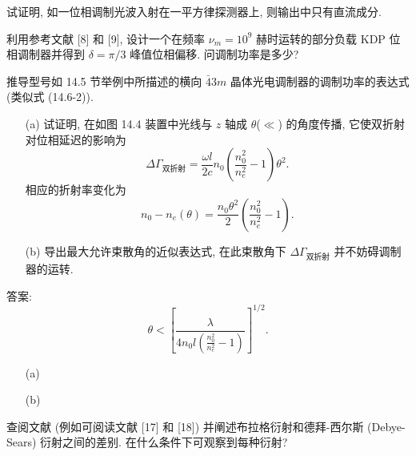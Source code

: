 \documentclass{note}
\begin{document}
\begin{exe}
    试证明, 如一位相调制光波入射在一平方律探测器上, 则输出中只有直流成分.
\end{exe}
\begin{pf}
    
\end{pf}

\begin{exe}
    利用参考文献 [8] 和 [9], 设计一个在频率 $\nu_m=10^9$ 赫时运转的部分负载 KDP 位相调制器并得到 $\delta=\pi/3$ 峰值位相偏移. 问调制功率是多少?
\end{exe}
\begin{sol}
    
\end{sol}

\begin{exe}
    推导型号如 14.5 节举例中所描述的横向 $\bar{4}3m$ 晶体光电调制器的调制功率的表达式 (类似式 (14.6-2)).
\end{exe}
\begin{pf}
    
\end{pf}

\begin{exe}
    \begin{itemize}
        \item[(a)] 试证明, 在如图 14.4 装置中光线与 $z$ 轴成 $\theta$($\ll$) 的角度传播, 它使双折射对位相延迟的影响为
        \[
            \Delta\Gamma_{\text{双折射}}=\frac{\omega l}{2c}n_0\left(\frac{n_0^2}{n_e^2}-1\right)\theta^2.
        \]
        相应的折射率变化为
        \[
            n_0-n_e(\theta)=\frac{n_0\theta^2}{2}\left(\frac{n_0^2}{n_e^2}-1\right).
        \]
        \item[(b)] 导出最大允许束散角的近似表达式, 在此束散角下 $\Delta\Gamma_{\text{双折射}}$ 并不妨碍调制器的运转.
    \end{itemize}
    答案:
    \[
        \theta<\left[\frac{\lambda}{4n_0l\left(\frac{n_0^2}{n_e^2}-1\right)}\right]^{1/2}.
    \]
\end{exe}
\begin{sol}
    \begin{itemize}
        \item[(a)] 
        \item[(b)] 
    \end{itemize}
\end{sol}

\begin{exe}
    查阅文献 (例如可阅读文献 [17] 和 [18]) 并阐述布拉格衍射和德拜-西尔斯 (Debye-Sears) 衍射之间的差别. 在什么条件下可观察到每种衍射?
\end{exe}
\begin{sol}
    
\end{sol}
\end{document}
